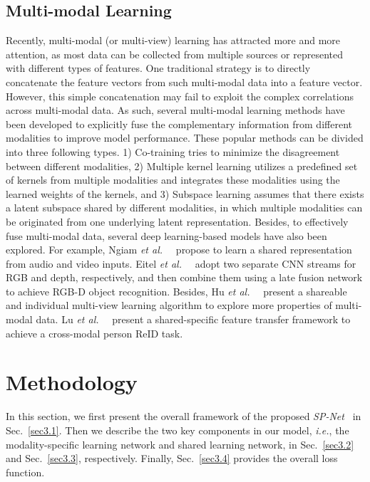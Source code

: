 \documentclass[10pt,twocolumn,letterpaper]{article}
\def\ie{\emph{i.e.}}
\def\etal{{\em et al.~}}
\def\ours{\emph{SP-Net}}
\begin{document}
\subsection{Multi-modal Learning}

Recently, multi-modal (or multi-view) learning has attracted more and more attention, as most data can be collected from multiple sources or represented with different types of features. One traditional strategy is to directly concatenate the feature vectors from such multi-modal data into a feature vector. However, this simple concatenation may fail to exploit the complex correlations across multi-modal data. As such, several multi-modal learning methods have been developed to explicitly fuse the complementary information from different modalities to improve model performance. These popular methods can be divided into three following types. 1) Co-training \cite{chaudhuri2009multi,ding2015robust} tries to minimize the disagreement between different modalities, 2) Multiple kernel learning \cite{gonen2011multiple} utilizes a predefined set of kernels from multiple modalities and integrates these modalities using the learned weights of the kernels, and 3) Subspace learning \cite{white2012convex,zhang2017latent} assumes that there exists a latent subspace shared by different modalities, in which multiple modalities can be originated from one underlying latent representation. Besides, to effectively fuse multi-modal data, several deep learning-based models have also been explored. For example, Ngiam \etal~\cite{ngiam2011multimodal} propose to learn a shared representation from audio and video inputs. Eitel \etal~\cite{eitel2015multimodal} adopt two separate CNN streams for RGB and depth, respectively, and then combine them using a late fusion network to achieve RGB-D object recognition. Besides, Hu \etal~\cite{hu2017sharable} present a shareable and individual multi-view learning algorithm to explore more properties of multi-modal data. Lu \etal~\cite{lu2020cross} present a shared-specific feature transfer framework to achieve a cross-modal person ReID task.


\section{Methodology}
In this section, we first present the overall framework of the proposed \ours~ in Sec.~\ref{sec3.1}. Then we describe the two key components in our model, \ie, the modality-specific learning network and shared learning network, in Sec.~\ref{sec3.2} and Sec.~\ref{sec3.3}, respectively. Finally, Sec.~\ref{sec3.4} provides the overall loss function.
\end{document}
